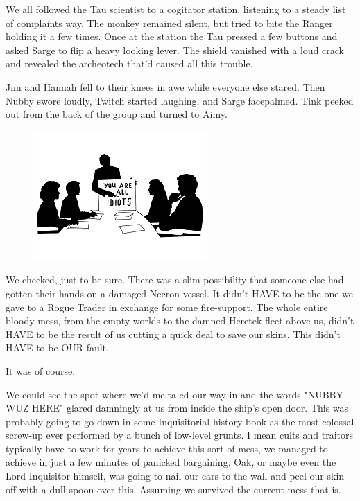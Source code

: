We all followed the Tau scientist to a cogitator station, listening to a steady list of complaints way. 
The monkey remained silent, but tried to bite the Ranger holding it a few times. 
Once at the station the Tau pressed a few buttons and asked Sarge to flip a heavy looking lever. 
The shield vanished with a loud crack and revealed the archeotech that'd caused all this trouble.

Jim and Hannah fell to their knees in awe while everyone else stared. 
Then Nubby swore loudly, Twitch started laughing, and Sarge facepalmed. 
Tink peeked out from the back of the group and turned to Aimy.



\begin{figure}
	\begin{center}
		\includegraphics[width=\figwidth]{pics/11/82.png}
	\end{center}
\end{figure}
We checked, just to be sure. 
There was a slim possibility that someone else had gotten their hands on a damaged Necron vessel. 
It didn't HAVE to be the one we gave to a Rogue Trader in exchange for some fire-support. 
The whole entire bloody mess, from the empty worlds to the damned Heretek fleet above us, didn't HAVE to be the result of us cutting a quick deal to save our skins. 
This didn't HAVE to be OUR fault.

It was of course.

We could see the spot where we'd melta-ed our way in and the words "NUBBY WUZ HERE" glared damningly at us from inside the ship's open door. 
This was probably going to go down in some Inquisitorial history book as the most colossal screw-up ever performed by a bunch of low-level grunts. 
I mean cults and traitors typically have to work for years to achieve this sort of mess, we managed to achieve in just a few minutes of panicked bargaining. 
Oak, or maybe even the Lord Inquisitor himself, was going to nail our ears to the wall and peel our skin off with a dull spoon over this. 
Assuming we survived the current mess that is.

